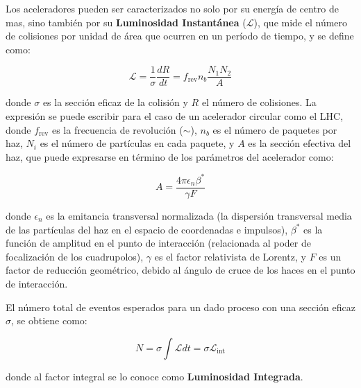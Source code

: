Los aceleradores pueden ser caracterizados no solo por su energía de centro de mas, sino también por su \textbf{Luminosidad Instantánea} ($\mathcal{L}$), que mide el número de colisiones por unidad de área que ocurren en un período de tiempo, y se define como: 

\begin{equation}
\mathcal{L}= \frac{1}{\sigma}\frac{dR}{dt} = f_{\text{rev}}n_{b}\frac{N_{1}N_{2}}{A}
\end{equation}

\noindent
donde $\sigma$ es la sección eficaz de la colisión y $R$ el número de colisiones. La expresión se puede escribir para el caso de un acelerador circular como el LHC, donde $f_{\text{rev}}$ es la frecuencia de revolución ($\sim$), $n_{b}$ es el número de paquetes por haz, $N_{i}$ es el número de partículas en cada paquete, y $A$ es la sección efectiva del haz, que puede expresarse en término de los parámetros del acelerador como:

\begin{equation}
A=\frac{4 \pi \epsilon_{n}\beta^{*}}{\gamma F}
\end{equation} 

\noindent
donde $\epsilon_{n}$ es la emitancia transversal normalizada (la dispersión transversal media de las partículas del haz en el espacio de coordenadas e impulsos), $\beta^{*}$ es la función de amplitud en el punto de interacción (relacionada al poder de focalización de los cuadrupolos), $\gamma$ es el factor relativista de Lorentz, y $F$ es un factor de reducción geométrico, debido al ángulo de cruce de los haces en el punto de interacción.

El número total de eventos esperados para un dado proceso con una sección eficaz $\sigma$, se obtiene como:

\begin{equation}
N=\sigma \int \mathcal{L} dt = \sigma \mathcal{L}_{\text{int}}
\label{eq:lumi_xs}
\end{equation}	

\noindent
donde al factor integral se lo conoce como \textbf{Luminosidad Integrada}.

